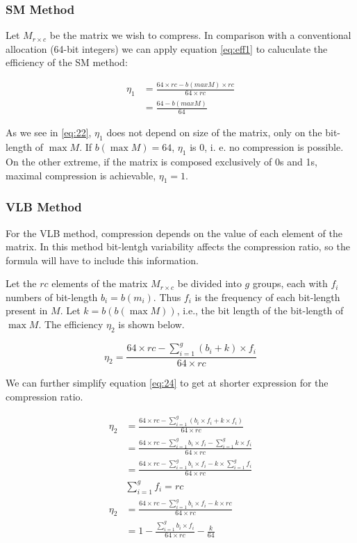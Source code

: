 \documentclass[10pt]{article}
\begin{document}
 \subsubsection*{SM Method}
 Let $M_{r \times c}$ be the matrix we wish to compress. In comparison with a conventional allocation (64-bit integers) we can apply equation \ref{eq:eff1} to caluculate the efficiency of the SM method:

\begin{align}\label{eq:22}
 \eta_1 &= \frac{64 \times rc - b(max M) \times rc}{64 \times rc}\nonumber\\
 &= \frac{64  - b(max M) }{64}
\end{align}

As we see in \ref{eq:22}, $\eta_1$ does not depend on size of the matrix, only on the bit-length of $\max M$. If $b(\max M)=64$, $\eta_1$ is 0, i. e. no compression is possible. On the other extreme, if the matrix is composed exclusively of 0s and 1s, maximal compression is achievable, $\eta_1=1$.
 
 \subsubsection*{VLB Method}
 
 For the VLB method, compression depends on the value of each element of the matrix. In this method bit-lentgh variability affects the compression ratio, so the formula will have to include this information.

Let the $rc$ elements of the matrix $M_{r \times c}$ be divided into $g$ groups, each with $f_i$ numbers of bit-length $b_i = b(m_i)$. Thus $f_i$ is the frequency of each bit-length present in $M$. Let $k = b(b(\max M))$, i.e., the bit length of the bit-length of $\max M$. The efficiency $\eta_2$ is shown below.

\begin{equation}\label{eq:24}
 \eta_2 = \frac{64 \times rc - \sum_{i=1}^{g} ( b_i + k ) \times f_i }{64 \times rc} 
\end{equation}

We can further simplify equation \ref{eq:24} to get at shorter expression for the compression ratio.

\begin{align} \label{eq:25}
 \eta_2 &= \frac{64 \times rc - \sum_{i=1}^{g} ( b_i \times f_i + k \times f_i )}{64 \times rc} \nonumber \\
  &= \frac{64 \times rc - \sum_{i=1}^{g}  b_i \times f_i  -\sum_{i=1}^{g}  k \times f_i }{64 \times rc}\nonumber \\
  &= \frac{64 \times rc - \sum_{i=1}^{g}  b_i \times f_i  - k \times\sum_{i=1}^{g}  f_i }{64 \times rc}\nonumber \\
 &\sum_{i=1}^{g} f_i = rc \nonumber \\
 \eta_2 &= \frac{64 \times rc - \sum_{i=1}^{g}  b_i \times f_i  - k \times rc }{64 \times rc}\nonumber \\
  &= 1 - \frac{\sum_{i=1}^{g}  b_i \times f_i }{64 \times rc} - \frac{k}{64}
\end{align}
\end{document}
